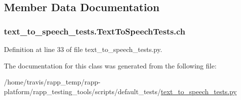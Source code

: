 \subsection{Member Data Documentation}
\hypertarget{classtext__to__speech__tests_1_1TextToSpeechTests_a3b44b7cc132334057952b21cc4ba864e}{
\subsubsection[{ch}]{\setlength{\rightskip}{0pt plus 5cm}text\-\_\-to\-\_\-speech\-\_\-tests.\-Text\-To\-Speech\-Tests.\-ch}}\label{classtext__to__speech__tests_1_1TextToSpeechTests_a3b44b7cc132334057952b21cc4ba864e}


Definition at line 33 of file text\-\_\-to\-\_\-speech\-\_\-tests.\-py.



The documentation for this class was generated from the following file\-:\begin{DoxyCompactItemize}
\item 
/home/travis/rapp\-\_\-temp/rapp-\/platform/rapp\-\_\-testing\-\_\-tools/scripts/default\-\_\-tests/\hyperlink{text__to__speech__tests_8py}{text\-\_\-to\-\_\-speech\-\_\-tests.\-py}\end{DoxyCompactItemize}
